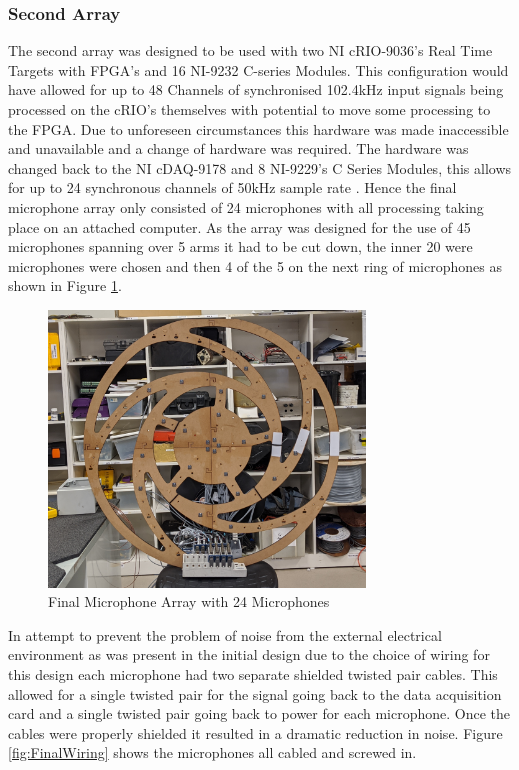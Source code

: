 \documentclass{UoNMCHA}
\numberwithin{equation}{section}
\begin{document}
\subsubsection{Second Array} \label{sec:Second Design DAQ}
    The second array was designed to be used with two NI cRIO-9036's Real Time Targets with FPGA's and 16 NI-9232 C-series Modules. This configuration would have allowed for up to 48 Channels of synchronised 102.4kHz input signals being processed on the cRIO's themselves with potential to move some processing to the FPGA. Due to unforeseen circumstances this hardware was made inaccessible and unavailable and a change of hardware was required. The hardware was changed back to the NI cDAQ-9178 and 8 NI-9229's C Series Modules, this allows for up to 24 synchronous channels of 50kHz sample rate \citep{NI9229}. Hence the final microphone array only consisted of 24 microphones with all processing taking place on an attached computer. As the array was designed for the use of 45 microphones spanning over 5 arms it had to be cut down, the inner 20 were microphones were chosen and then 4 of the 5 on the next ring of microphones as shown in Figure \ref{fig:FinalBuild}.
    
    \begin{figure} [H]
        \centering
        \includegraphics[keepaspectratio, width = 0.75\textwidth]{Figures/FinalArrayBuilt.png}
        \caption{Final Microphone Array with 24 Microphones}
        \label{fig:FinalBuild}
    \end{figure}

    In attempt to prevent the problem of noise from the external electrical environment as was present in the initial design due to the choice of wiring for this design each microphone had two separate shielded twisted pair cables. This allowed for a single twisted pair for the signal going back to the data acquisition card and a single twisted pair going back to power for each microphone. Once the cables were properly shielded it resulted in a dramatic reduction in noise. Figure \ref{fig:FinalWiring} shows the microphones all cabled and screwed in. 
\end{document}
